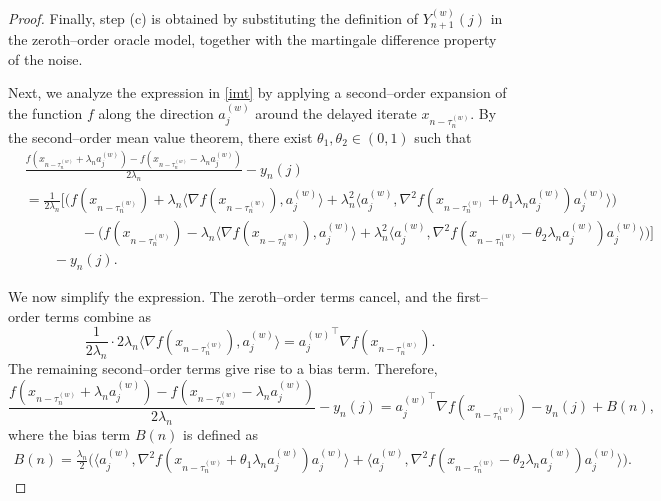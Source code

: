 \documentclass{article}
\begin{document}
\begin{proof}
Finally, step (c) is obtained by substituting the definition of $Y_{n+1}^{(w)}(j)$ in the zeroth--order oracle model, together with the martingale difference property of the noise. 

Next, we analyze the expression in \eqref{imt} by applying a second--order expansion of the function $f$ along the direction $a_j^{(w)}$ around the delayed iterate $x_{n-\tau_n^{(w)}}$. By the second--order mean value theorem, there exist $\theta_1, \theta_2 \in (0,1)$ such that
\begin{equation}
\begin{split}
&\frac{f\!\left(x_{n-\tau_n^{(w)}} + \lambda_n a_j^{(w)}\right) 
- f\!\left(x_{n-\tau_n^{(w)}} - \lambda_n a_j^{(w)}\right)}{2\lambda_n}
- y_n(j) \\
&= \frac{1}{2\lambda_n} \Big[
    \big( f(x_{n-\tau_n^{(w)}}) 
    + \lambda_n \langle \nabla f(x_{n-\tau_n^{(w)}}), a_j^{(w)} \rangle 
    + \lambda_n^2 \langle a_j^{(w)}, \nabla^2 f(x_{n-\tau_n^{(w)}} + \theta_1 \lambda_n a_j^{(w)}) a_j^{(w)} \rangle \big) \\
&\qquad\qquad
    - \big( f(x_{n-\tau_n^{(w)}}) 
    - \lambda_n \langle \nabla f(x_{n-\tau_n^{(w)}}), a_j^{(w)} \rangle 
    + \lambda_n^2 \langle a_j^{(w)}, \nabla^2 f(x_{n-\tau_n^{(w)}} - \theta_2 \lambda_n a_j^{(w)}) a_j^{(w)} \rangle \big)
\Big] \\
&\qquad - y_n(j).
\end{split}
\label{properties of gradient}
\end{equation}

We now simplify the expression. The zeroth--order terms cancel, and the first--order terms combine as
\[
\frac{1}{2\lambda_n} \cdot 2\lambda_n \langle \nabla f(x_{n-\tau_n^{(w)}}), a_j^{(w)} \rangle
= {a_j^{(w)}}^\top \nabla f(x_{n-\tau_n^{(w)}}).
\]
The remaining second--order terms give rise to a bias term. Therefore,
\[
\frac{f\!\left(x_{n-\tau_n^{(w)}} + \lambda_n a_j^{(w)}\right) 
- f\!\left(x_{n-\tau_n^{(w)}} - \lambda_n a_j^{(w)}\right)}{2\lambda_n}
- y_n(j)
= {a_j^{(w)}}^\top \nabla f(x_{n-\tau_n^{(w)}}) - y_n(j) + B(n),
\]
where the bias term $B(n)$ is defined as
\begin{equation*}
\begin{split}
B(n)
= \frac{\lambda_n}{2} \Big(
\langle a_j^{(w)}, \nabla^2 f(x_{n-\tau_n^{(w)}} + \theta_1 \lambda_n a_j^{(w)}) a_j^{(w)} \rangle
+
\langle a_j^{(w)}, \nabla^2 f(x_{n-\tau_n^{(w)}} - \theta_2 \lambda_n a_j^{(w)}) a_j^{(w)} \rangle
\Big).
\end{split}
\end{equation*}


\end{proof}
\end{document}
